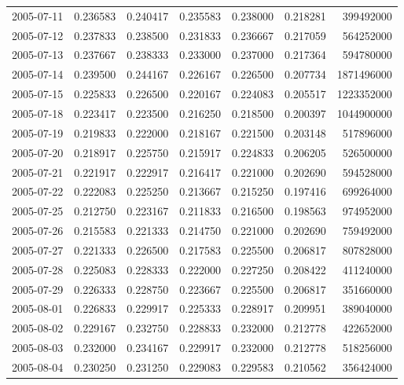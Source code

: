 \begin{tabular}{lrrrrrr}
2005-07-11 &    0.236583 &    0.240417 &    0.235583 &    0.238000 &    0.218281 &   399492000 \\
2005-07-12 &    0.237833 &    0.238500 &    0.231833 &    0.236667 &    0.217059 &   564252000 \\
2005-07-13 &    0.237667 &    0.238333 &    0.233000 &    0.237000 &    0.217364 &   594780000 \\
2005-07-14 &    0.239500 &    0.244167 &    0.226167 &    0.226500 &    0.207734 &  1871496000 \\
2005-07-15 &    0.225833 &    0.226500 &    0.220167 &    0.224083 &    0.205517 &  1223352000 \\
2005-07-18 &    0.223417 &    0.223500 &    0.216250 &    0.218500 &    0.200397 &  1044900000 \\
2005-07-19 &    0.219833 &    0.222000 &    0.218167 &    0.221500 &    0.203148 &   517896000 \\
2005-07-20 &    0.218917 &    0.225750 &    0.215917 &    0.224833 &    0.206205 &   526500000 \\
2005-07-21 &    0.221917 &    0.222917 &    0.216417 &    0.221000 &    0.202690 &   594528000 \\
2005-07-22 &    0.222083 &    0.225250 &    0.213667 &    0.215250 &    0.197416 &   699264000 \\
2005-07-25 &    0.212750 &    0.223167 &    0.211833 &    0.216500 &    0.198563 &   974952000 \\
2005-07-26 &    0.215583 &    0.221333 &    0.214750 &    0.221000 &    0.202690 &   759492000 \\
2005-07-27 &    0.221333 &    0.226500 &    0.217583 &    0.225500 &    0.206817 &   807828000 \\
2005-07-28 &    0.225083 &    0.228333 &    0.222000 &    0.227250 &    0.208422 &   411240000 \\
2005-07-29 &    0.226333 &    0.228750 &    0.223667 &    0.225500 &    0.206817 &   351660000 \\
2005-08-01 &    0.226833 &    0.229917 &    0.225333 &    0.228917 &    0.209951 &   389040000 \\
2005-08-02 &    0.229167 &    0.232750 &    0.228833 &    0.232000 &    0.212778 &   422652000 \\
2005-08-03 &    0.232000 &    0.234167 &    0.229917 &    0.232000 &    0.212778 &   518256000 \\
2005-08-04 &    0.230250 &    0.231250 &    0.229083 &    0.229583 &    0.210562 &   356424000 \\

\end{tabular}
